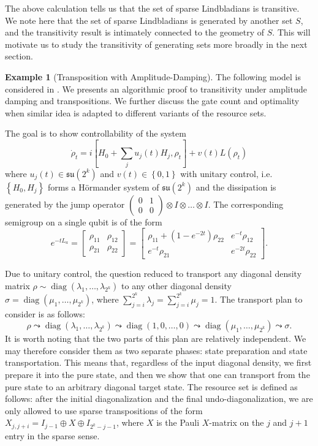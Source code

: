 \documentclass[11pt,reqno]{amsart}
\theoremstyle{definition}
\newtheorem{example}[theorem]{Example}
\newcommand{\mf}{\mathfrak}
\newcommand{\lset}{\left\{ }
\newcommand{\rset}{\right\} }
\newcommand{\lbra}{\left[}
\newcommand{\rbra}{\right]}
\DeclareMathOperator{\diag}{diag}
\begin{document}
The above calculation tells us that the set of sparse Lindbladians is transitive. We note here that the set of sparse Lindbladians is generated by another set $S$, and the transitivity result is intimately connected to the geometry of $S$. This will motivate us to study the transitivity of generating sets more broadly in the next section.


\begin{example}[Transposition with Amplitude-Damping]
    The following model is considered in \cite{bergholm2016}. We presents an algorithmic proof to transitivity under amplitude damping and transpositions. We further discuss the gate count and optimality when similar idea is adapted to different variants of the resource sets.
    
    The goal is to show controllability of the system
    $$\dot\rho_t=i\lbra H_0+\sum_{j}u_j(t)H_j,\rho_t\rbra+v(t)L(\rho_t)$$
    where $u_j(t)\in \mf{su}(2^k)$ and $v(t)\in\lset 0,1\rset$
    with unitary control, i.e. $\lset H_0, H_j\rset$ forms a Hörmander system of $\mf{su}(2^k)$ and the dissipation is generated by the jump operator $\begin{pmatrix}
        0 & 1\\
        0 & 0
    \end{pmatrix}\otimes I\otimes\dots\otimes I$.
    The corresponding semigroup on a single qubit is of the form
    $$e^{-tL_a}=\lbra\begin{array}{cc}
        \rho_{11} & \rho_{12}\\
        \rho_{21} & \rho_{22}
    \end{array}\rbra=\lbra\begin{array}{cc}
        \rho_{11}+(1-e^{-2t})\rho_{22} & e^{-t}\rho_{12}\\
        e^{-t}\rho_{21} & e^{-2t}\rho_{22}
    \end{array}\rbra.$$
    
    Due to unitary control, the question reduced to transport any diagonal density matrix $\rho\sim\diag(\lambda_1,\dots, \lambda_{2^k})$ to any other diagonal density $\sigma=\diag(\mu_1,\dots, \mu_{2^k})$, where $\sum_{j=i}^{2^k}\lambda_j=\sum_{j=i}^{2^k}\mu_j=1$. The transport plan to consider is as follows:
    $$\rho\leadsto\diag(\lambda_1,\dots, \lambda_{2^k})\leadsto \diag(1,0,\dots, 0)\leadsto\diag(\mu_1,\dots, \mu_{2^k})\leadsto \sigma.$$
    It is worth noting that the two parts of this plan are relatively independent. We may therefore consider them as two separate phases: state preparation and state transportation. This means that, regardless of the input diagonal density, we first prepare it into the pure state, and then we show that one can transport from the pure state to an arbitrary diagonal target state.
    The resource set is defined as follows: after the initial diagonalization and the final undo-diagonalization, we are only allowed to use sparse transpositions of the form $X_{j, j+i}=I_{j-1}\oplus X\oplus I_{2^k-j-1}$, where $X$ is the Pauli $X$-matrix on the $j$ and $j+1$ entry in the sparse sense.


\end{example}
\end{document}
